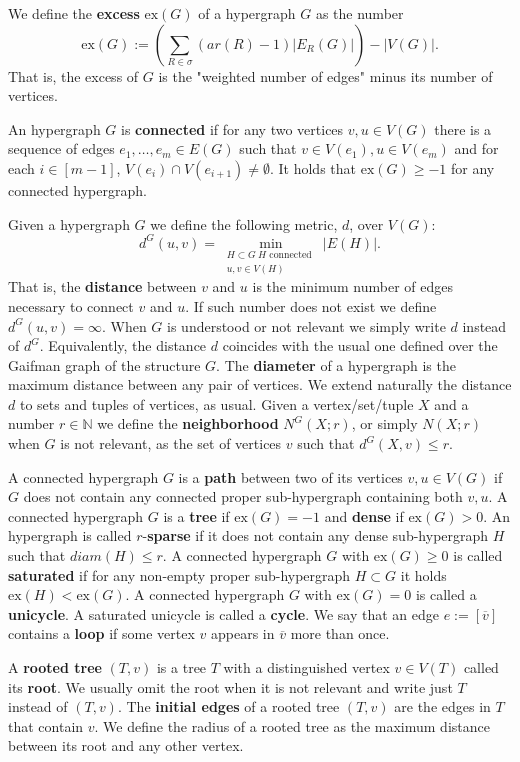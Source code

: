 \documentclass[12pt,notitlepage,a4paper]{article}
\theoremstyle{definition}
\newcommand{\N}{\mathbb{N}}
\newcommand{\ex}{\mathrm{ex}}
\begin{document}
We define the \textbf{excess} $\ex(G)$ of a hypergraph $G$ as the number
\[
\ex(G):= \left(\sum_{R\in \sigma} (ar(R)-1)|E_R(G)|\right) - |V(G)|.  
\] 
That is, the excess of $G$ is the "weighted number of edges"
minus its number of vertices. \par
An hypergraph $G$ is \textbf{connected} if for any two vertices $v,u\in V(G)$
there is a sequence of edges $e_1,\dots, e_m\in E(G)$ such that
$v\in V(e_1), u\in V(e_m)$ and for each $i\in [m-1]$, 
$V(e_i)\cap V(e_{i+1})\neq \emptyset$. It holds that
$\ex(G)\geq -1$ for any connected hypergraph.
\par
Given a hypergraph $G$ we define the following metric, $d$, over $V(G)$:
\[ d^G(u,v)= \min_{\substack{H \subset G\ 
		H \text{ connected }\\
		u,v\in V(H)}} |E(H)| .\]
That is, the \textbf{distance} between $v$ and $u$ is the minimum number of
edges necessary to connect $v$ and $u$. 
If such number does not exist we define $d^G(u,v)=\infty$. 
When $G$ 
is understood or not relevant we simply write $d$ instead of $d^G$.
Equivalently, the distance $d$
coincides with the usual one defined over the Gaifman graph of the structure 
$G$. The \textbf{diameter} of a hypergraph is the maximum distance between any 
pair of vertices. 
We extend naturally the distance $d$ to sets and tuples of
vertices, as usual. Given a vertex/set/tuple $X$ and a number
$r\in \N$ we define the \textbf{neighborhood}
$N^G(X;r)$, or simply $N(X;r)$ when $G$ is not relevant,
as the set of vertices $v$ such that $d^G(X,v)\leq r$.
\par
A connected hypergraph $G$ is a \textbf{path} between two of its 
vertices $v,u\in V(G)$ if $G$ 
does not contain any connected proper sub-hypergraph containing both $v,u$.
A connected hypergraph $G$ is a \textbf{tree} if $\ex(G)=-1$ and \textbf{dense} if $\ex(G)>0$.
An hypergraph is called $r$-\textbf{sparse} if it does not contain any dense sub-hypergraph $H$
such that $diam(H)\leq r$.
A connected hypergraph $G$ with $\ex(G)\geq 0$ is called \textbf{saturated} 
if for any non-empty proper sub-hypergraph
$H\subset G$ it holds $\ex(H)<\ex(G)$. 
A connected hypergraph $G$ with $\ex(G)=0$ is called a \textbf{unicycle}. 
A saturated unicycle is called a \textbf{cycle}. We say that an edge $e:=[\overline{v}]$
contains a \textbf{loop} if some vertex $v$ appears in $\overline{v}$ more than once.\par
A \textbf{rooted tree} $(T,v)$ is a tree $T$ with a 
distinguished vertex $v\in V(T)$ called its \textbf{root}.
We usually omit the root when it is not relevant and 
write just $T$ instead of $(T,v)$. The
\textbf{initial edges} of a rooted tree $(T,v)$ are 
the edges in $T$ that contain $v$. 
We define the radius of a rooted tree
as the maximum distance between its root
and any other vertex.
\par
\end{document}
